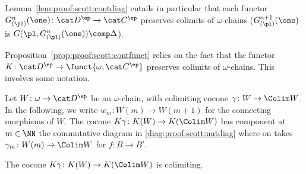 Lemma~\ref{lem:proof:scott:contdiag}
entails in particular that each functor
$G^n_{(\pl)}(\one) \colon \cat D^\ep \to \cat C^\ep$
preserves colimits of $\omega$-chains
($G^{n+1}_{(\pl)}(\one)$ is
$G(\pl,G^{n}_{(\pl)}(\one)) \comp \Delta$).

Proposition~\ref{prop:proof:scott:contfunct}
relies on the fact that the functor
$K \colon \cat D^\ep \to \funct{\omega,\cat C^\ep}$
preserves colimits of $\omega$-chains.
This involves some notation.

Let $W \colon \omega \to \cat D^\ep$ be an $\omega$-chain,
with colimiting cocone $\gamma \colon W \to \Colim W$.
In the following, we write $w_m \colon W(m) \to W(m+1)$
for the connecting morphisms of $W$.
The cocone $K \gamma \colon K(W) \to K(\Colim W)$
has component at $m \in \NN$
the commutative diagram in \eqref{diag:proof:scott:natdiag}
where on takes $\gamma_m \colon W(m) \to \Colim W$
for $f \colon B \to B'$.


\begin{lemma}
\label{lem:proof:scott:colimiting}
The cocone $K\gamma \colon K(W) \to K(\Colim W)$
is colimiting.
\end{lemma}

